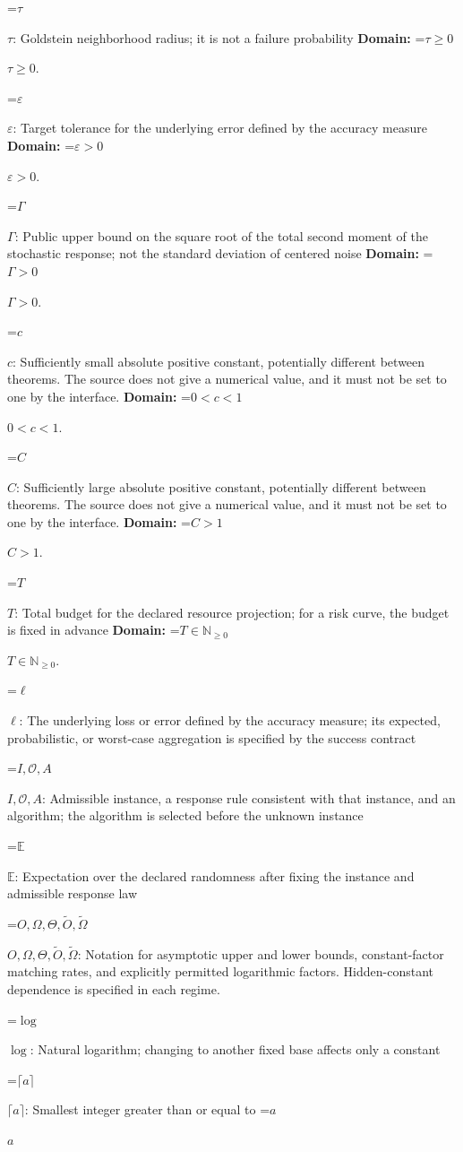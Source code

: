 \documentclass[10pt,a4paper]{article}
\newcommand{\AtlasMath}[1]{\par\begingroup\centering\setbox0=\hbox{$\displaystyle #1$}\ifdim\wd0>1.4\linewidth\typeout{ATLAS WIDE FORMULA: \the\wd0}\fi\ifdim\wd0>\linewidth\resizebox{\linewidth}{!}{\box0}\else\box0\fi\par\endgroup}
\newcommand{\AtlasInlineMath}[1]{\begingroup\setbox0=\hbox{$#1$}\ifdim\wd0>.4\linewidth\endgroup\AtlasMath{#1}\else\endgroup$#1$\fi}
\begin{document}
\AtlasInlineMath{\tau}: Goldstein neighborhood radius; it is not a failure probability \textbf{Domain:} \AtlasInlineMath{\tau\ge0}.

\AtlasInlineMath{\varepsilon}: Target tolerance for the underlying error defined by the accuracy measure \textbf{Domain:} \AtlasInlineMath{\varepsilon>0}.

\AtlasInlineMath{\Gamma}: Public upper bound on the square root of the total second moment of the stochastic response; not the standard deviation of centered noise \textbf{Domain:} \AtlasInlineMath{\Gamma>0}.

\AtlasInlineMath{c}: Sufficiently small absolute positive constant, potentially different between theorems. The source does not give a numerical value, and it must not be set to one by the interface. \textbf{Domain:} \AtlasInlineMath{0<c<1}.

\AtlasInlineMath{C}: Sufficiently large absolute positive constant, potentially different between theorems. The source does not give a numerical value, and it must not be set to one by the interface. \textbf{Domain:} \AtlasInlineMath{C>1}.

\AtlasInlineMath{T}: Total budget for the declared resource projection; for a risk curve, the budget is fixed in advance \textbf{Domain:} \AtlasInlineMath{T\in\mathbb{N}_{\ge0}}.

\AtlasInlineMath{\ell}: The underlying loss or error defined by the accuracy measure; its expected, probabilistic, or worst-case aggregation is specified by the success contract

\AtlasInlineMath{I,\mathcal{O},A}: Admissible instance, a response rule consistent with that instance, and an algorithm; the algorithm is selected before the unknown instance

\AtlasInlineMath{\mathbb{E}}: Expectation over the declared randomness after fixing the instance and admissible response law

\AtlasInlineMath{O,\Omega,\Theta,\widetilde{O},\widetilde\Omega}: Notation for asymptotic upper and lower bounds, constant-factor matching rates, and explicitly permitted logarithmic factors. Hidden-constant dependence is specified in each regime.

\AtlasInlineMath{\log}: Natural logarithm; changing to another fixed base affects only a constant

\AtlasInlineMath{\lceil a\rceil}: Smallest integer greater than or equal to \AtlasInlineMath{a}
\end{document}
